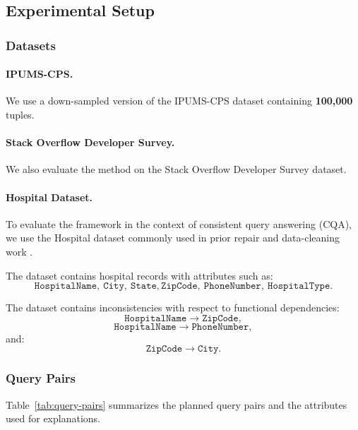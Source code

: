 \subsection{Experimental Setup}
\label{subsec:experimental-setup}


\subsubsection{Datasets}

\paragraph{IPUMS-CPS.}
We use a down-sampled version of the IPUMS-CPS dataset containing
\textbf{100,000} tuples.

\paragraph{Stack Overflow Developer Survey.}
We also evaluate the method on the Stack Overflow Developer Survey dataset.

\paragraph{Hospital Dataset.}
To evaluate the framework in the context of consistent query answering (CQA),
we use the Hospital dataset commonly used in prior repair and data-cleaning
work \cite{rekatsinas2017}.

The dataset contains hospital records with attributes such as:
\[
\texttt{HospitalName},\ \texttt{City},\ \texttt{State},
\texttt{ZipCode},\ \texttt{PhoneNumber},\ \texttt{HospitalType}.
\]

The dataset contains inconsistencies with respect to functional dependencies:
\[
\texttt{HospitalName} \rightarrow \texttt{ZipCode},
\]
\[
\texttt{HospitalName} \rightarrow \texttt{PhoneNumber},
\]
and:
\[
\texttt{ZipCode} \rightarrow \texttt{City}.
\]

\subsubsection{Query Pairs}
Table~\ref{tab:query-pairs} summarizes the planned query pairs and the
attributes used for explanations.

